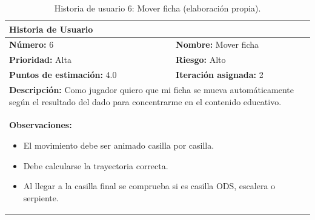 \begin{table}[H]
\centering
\caption{Historia de usuario 6: Mover ficha (elaboración propia).\label{tab:hu6}}
\renewcommand{\arraystretch}{1.5}
\begin{tabular}{|p{}|p{}|}
\hline
\multicolumn{2}{|l|}{\textbf{Historia de Usuario}} \\
\hline
\textbf{Número:} 6 & \textbf{Nombre:} Mover ficha \\
\hline
\textbf{Prioridad:} Alta & \textbf{Riesgo:} Alto \\
\hline
\textbf{Puntos de estimación:} 4.0 & \textbf{Iteración asignada:} 2 \\
\hline
\multicolumn{2}{|p{0.945\textwidth}|}{\textbf{Descripción:} Como jugador quiero que mi ficha se mueva automáticamente según el resultado del dado para concentrarme en el contenido educativo.} \\
\hline
\multicolumn{2}{|p{0.945\textwidth}|}{\textbf{Observaciones:}
\vspace{-0.5em}
\begin{itemize}
    \setlength\itemsep{0em}
    \item El movimiento debe ser animado casilla por casilla.
    \item Debe calcularse la trayectoria correcta.
    \item Al llegar a la casilla final se comprueba si es casilla ODS, escalera o serpiente.
\end{itemize}
\vspace{-1em}
} \\
\hline
\end{tabular}
\end{table}

